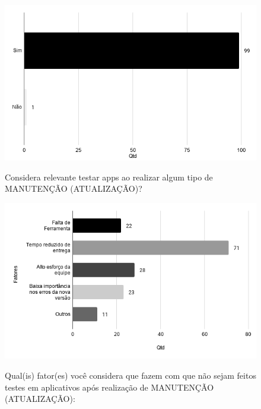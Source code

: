     
        \begin{figure}[!htb]
        \centering
        \includegraphics[width=.80\textwidth]{images/s_imptestarmanutencao.png}
        \label{figure:s_imptestarmanutencao}
        \caption{Considera relevante testar apps ao realizar algum tipo de MANUTENÇÃO (ATUALIZAÇÃO)?}
        \end{figure}
    
    
        \begin{figure}[!htb]
        \centering
        \includegraphics[width=.80\textwidth]{images/s_fatorestestemanutencao.png}
        \label{figure:s_fatorestestemanutencao}
        \caption{Qual(is) fator(es) você considera que fazem com que não sejam feitos testes em aplicativos após realização de MANUTENÇÃO (ATUALIZAÇÃO):}
        \end{figure}
    

